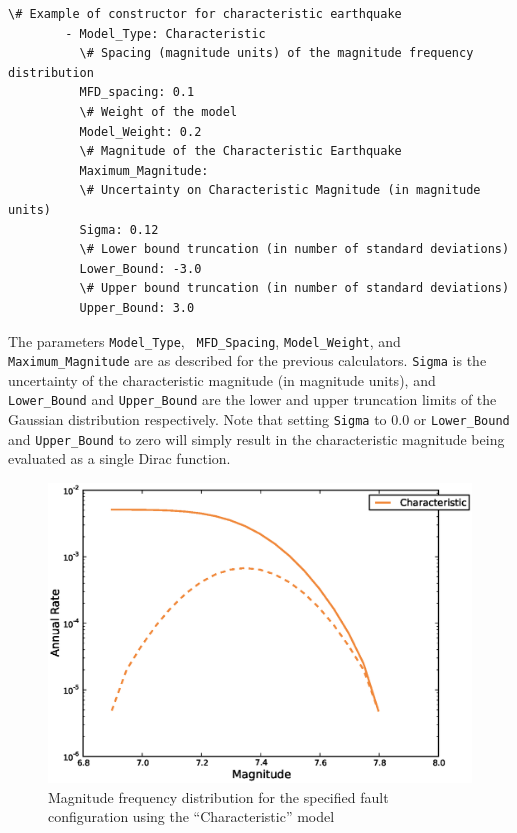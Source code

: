 \begin{Verbatim}[frame=single, commandchars=\\\{\}, fontsize=\scriptsize]
          \# Example of constructor for characteristic earthquake
        - Model_Type: Characteristic
          \# Spacing (magnitude units) of the magnitude frequency distribution
          MFD_spacing: 0.1
          \# Weight of the model
          Model_Weight: 0.2
          \# Magnitude of the Characteristic Earthquake
          Maximum_Magnitude:
          \# Uncertainty on Characteristic Magnitude (in magnitude units)
          Sigma: 0.12
          \# Lower bound truncation (in number of standard deviations)
          Lower_Bound: -3.0
          \# Upper bound truncation (in number of standard deviations)
          Upper_Bound: 3.0
\end{Verbatim}

The parameters \verb=Model_Type=, \verb= MFD_Spacing=, \verb=Model_Weight=, and\verb= Maximum_Magnitude= are as described for the previous calculators. \verb=Sigma= is the uncertainty of the characteristic magnitude (in magnitude units), and \verb=Lower_Bound= and \verb=Upper_Bound= are the lower and upper truncation limits of the Gaussian distribution respectively. Note that setting \verb=Sigma= to 0.0 or \verb=Lower_Bound= and \verb=Upper_Bound= to zero will simply result in the characteristic magnitude being evaluated as a single Dirac function.

\begin{figure}[htb]
  \centering
      \includegraphics[trim=5mm 5mm 5mm 5mm, clip, width=12cm]{./figures/characteristic_mfds.eps}
  \caption{Magnitude frequency distribution for the specified fault configuration using the ``Characteristic'' model}
  \label{fig:characteristic}
\end{figure}

